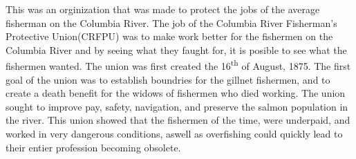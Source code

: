 \documentclass{article}
\begin{document}
This was an orginization that was made to protect the jobs of the average fisherman on the Columbia River. The job of the Columbia River Fisherman's Protective Union(CRFPU) was to make work better for the fishermen on the Columbia River and by seeing what they faught for, it is posible to see what the fishermen wanted. The union was first created the 16\textsuperscript{th} of August, 1875. The first goal of the union was to establish boundries for the gillnet fishermen, and to create a death benefit for the widows of fishermen who died working. The union sought to improve pay, safety, navigation, and preserve the salmon population in the river. This union showed that the fishermen of the time, were underpaid, and worked in very dangerous conditions, aswell as overfishing could quickly lead to their entier profession becoming obsolete.
\end{document}
